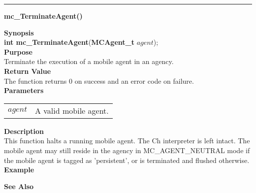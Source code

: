 \noindent
\vspace{5pt}
\rule{6.5in}{0.015in}
\noindent
{\LARGE \bf mc\_TerminateAgent()}\\
{}
\label{api:mc_TerminateAgent()}

\noindent
{\bf Synopsis}\\
{\bf int mc\_TerminateAgent}({\bf MCAgent\_t} $agent$);\\

\noindent
{\bf Purpose}\\
Terminate the execution of a mobile agent in an agency.\\

\noindent
{\bf Return Value}\\
The function returns 0 on success and an error code on failure.\\

\noindent
{\bf Parameters}
\vspace{-0.1in}
\begin{description}
\item
\begin{tabular}{p{10 mm}p{145 mm}}
$agent$ & A valid mobile agent.
\end{tabular}
\end{description}

\noindent
{\bf Description}\\
This function halts a running mobile agent. 
The Ch interpreter is left intact. 
The mobile agent may still reside in the agency in MC\_AGENT\_NEUTRAL mode if 
the mobile agent is tagged as 'persistent', or is terminated and flushed 
otherwise.\\

\noindent
{\bf Example}\\
\noindent
{\footnotesize}

\noindent
{\bf See Also}\\

